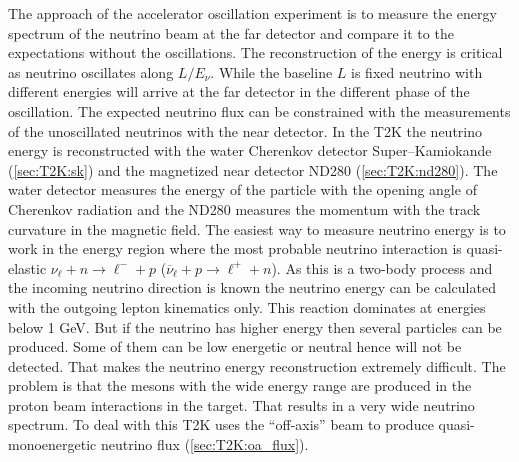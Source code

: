 \documentclass[../main.tex]{subfiles}
\begin{document}
The approach of the accelerator oscillation experiment is to measure the energy spectrum of the neutrino beam at the far detector and compare it to the expectations without the oscillations. The reconstruction of the energy is critical as neutrino oscillates along $L/E_\nu$. While the baseline $L$ is fixed neutrino with different energies will arrive at the far detector in the different phase of the oscillation. The expected neutrino flux can be constrained with the measurements of the unoscillated neutrinos with the near detector. In the T2K the neutrino energy is reconstructed with the water Cherenkov detector Super--Kamiokande (\autoref{sec:T2K:sk}) and the magnetized near detector ND280 (\autoref{sec:T2K:nd280}). The water detector measures the energy of the particle with the opening angle of Cherenkov radiation and the ND280 measures the momentum with the track curvature in the magnetic field. The easiest way to measure neutrino energy is to work in the energy region where the most probable neutrino interaction is quasi-elastic $\nu_\ell+n\to\ell^-+p$ ($\overline{\nu}_\ell+p\to\ell^++n$). As this is a two-body process and the incoming neutrino direction is known the neutrino energy can be calculated with the outgoing lepton kinematics only. This reaction dominates at energies below 1 GeV. But if the neutrino has higher energy then several particles can be produced. Some of them can be low energetic or neutral hence will not be detected. That makes the neutrino energy reconstruction extremely difficult. The problem is that the mesons with the wide energy range are produced in the proton beam interactions in the target. That results in a very wide neutrino spectrum. To deal with this T2K uses the ``off-axis'' beam to produce quasi-monoenergetic neutrino flux (\autoref{sec:T2K:oa_flux}).
\end{document}
